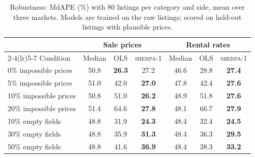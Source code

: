 \begin{table}[t]
\centering\small
\caption{Robustness: MdAPE (\%) with 80 listings per category and side, mean over three markets. Models are trained on the raw listings; scored on held-out listings with plausible prices.}
\label{tab:robust}
\begin{tabular}{lcccccc}
\toprule
 & \multicolumn{3}{c}{Sale prices} & \multicolumn{3}{c}{Rental rates} \\
\cmidrule(lr){2-4}\cmidrule(lr){5-7}
Condition & Median & OLS & \textsc{sherpa-1} & Median & OLS & \textsc{sherpa-1} \\
\midrule
0\% impossible prices & 50.8 & \textbf{26.3} & 27.2 & 46.6 & 28.8 & \textbf{27.4} \\
5\% impossible prices & 51.0 & 42.0 & \textbf{27.0} & 47.8 & 42.4 & \textbf{27.6} \\
10\% impossible prices & 50.8 & 51.0 & \textbf{26.2} & 48.9 & 51.8 & \textbf{27.6} \\
20\% impossible prices & 51.4 & 64.6 & \textbf{27.8} & 48.1 & 66.7 & \textbf{27.9} \\
\midrule
10\% empty fields & 48.8 & 31.9 & \textbf{24.3} & 48.4 & 32.4 & \textbf{24.5} \\
30\% empty fields & 48.8 & 35.9 & \textbf{31.3} & 48.4 & 36.3 & \textbf{29.5} \\
50\% empty fields & 48.8 & 41.6 & \textbf{36.9} & 48.4 & 38.3 & \textbf{33.2} \\
\bottomrule
\end{tabular}
\end{table}
